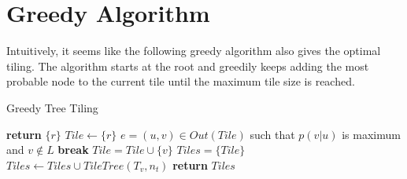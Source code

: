 \section{Greedy Algorithm}

Intuitively, it seems like the following greedy algorithm also gives the optimal tiling. The algorithm starts at the root and greedily keeps adding the most probable node to the current tile until the maximum tile size is reached.
\begin{algorithm}
    \caption{Greedy Tree Tiling}
    \label{GreedyTilingAlgo}
    \begin{algorithmic}
                \State \textbf{return} $\{ r \}$
            \EndIf
            \State $Tile \leftarrow \{ r \}$
                \State $e = (u,v) \in Out(Tile)$ such that $p(v | u)$ is maximum and $v \notin L$
                    \State \textbf{break}
                \EndIf
                \State $Tile = Tile \cup \{ v \}$
            \EndWhile
            \State $Tiles =  \{ Tile \}$
                \State $Tiles \leftarrow Tiles \cup TileTree(T_v, n_t)$
            \EndFor
            \State \textbf{return} $Tiles$
        \EndProcedure
    \end{algorithmic}
\end{algorithm}
